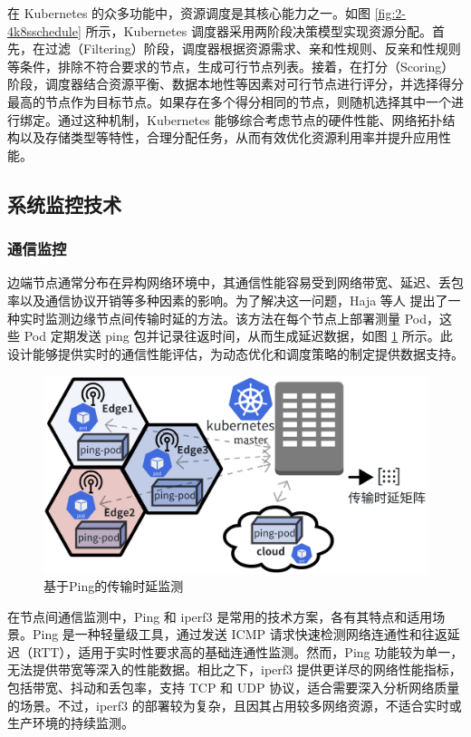 在 Kubernetes 的众多功能中，资源调度是其核心能力之一。如图 \ref{fig:2-4k8sschedule} 所示，Kubernetes 调度器采用两阶段决策模型实现资源分配。首先，在过滤（Filtering）阶段，调度器根据资源需求、亲和性规则、反亲和性规则等条件，排除不符合要求的节点，生成可行节点列表。接着，在打分（Scoring）阶段，调度器结合资源平衡、数据本地性等因素对可行节点进行评分，并选择得分最高的节点作为目标节点。如果存在多个得分相同的节点，则随机选择其中一个进行绑定。通过这种机制，Kubernetes 能够综合考虑节点的硬件性能、网络拓扑结构以及存储类型等特性，合理分配任务，从而有效优化资源利用率并提升应用性能。

\subsection{系统监控技术}

\subsubsection{通信监控}

边端节点通常分布在异构网络环境中，其通信性能容易受到网络带宽、延迟、丢包率以及通信协议开销等多种因素的影响。为了解决这一问题，Haja 等人\cite{haja2019sharpening} 提出了一种实时监测边缘节点间传输时延的方法。该方法在每个节点上部署测量 Pod，这些 Pod 定期发送 ping 包并记录往返时间，从而生成延迟数据，如图 \ref{fig:2-6ping} 所示。此设计能够提供实时的通信性能评估，为动态优化和调度策略的制定提供数据支持。

\begin{figure}[ht]
  \centering
  \includegraphics[width=0.75\linewidth]{pics/2-6ping.png}
  \caption{基于Ping的传输时延监测\cite{haja2019sharpening}}
  \label{fig:2-6ping}
\end{figure}

在节点间通信监测中，Ping 和 iperf3 是常用的技术方案，各有其特点和适用场景。Ping 是一种轻量级工具，通过发送 ICMP 请求快速检测网络连通性和往返延迟（RTT），适用于实时性要求高的基础连通性监测。然而，Ping 功能较为单一，无法提供带宽等深入的性能数据。相比之下，iperf3 提供更详尽的网络性能指标，包括带宽、抖动和丢包率，支持 TCP 和 UDP 协议，适合需要深入分析网络质量的场景。不过，iperf3 的部署较为复杂，且因其占用较多网络资源，不适合实时或生产环境的持续监测。

